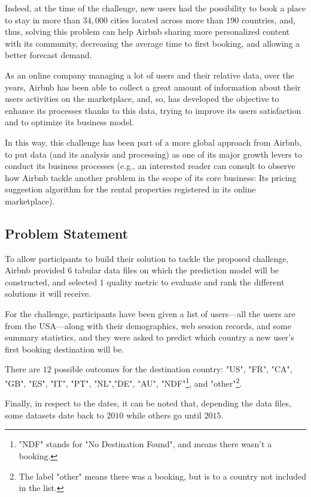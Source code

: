 \documentclass[twocolumn, switch]{article}
\begin{document}
Indeed, at the time of the challenge, new users had the possibility to book a place to stay in more than $34,000$ cities located across more than $190$ countries, and, thus, solving this problem can help Airbnb sharing more personalized content with its community, decreasing the average time to first booking, and allowing a better forecast demand.

As an online company managing a lot of users and their relative data, over the years, Airbnb has been able to collect a great amount of information about their users activities on the marketplace, and, so, has developed the objective to enhance its processes thanks to this data, trying to improve its users satisfaction and to optimize its business model.

In this way, this challenge has been part of a more global approach from Airbnb, to put data (and its analysis and processing) as one of its major growth levers to conduct its business processes (e.g., an interested reader can consult \cite{Hill_2015} to observe how Airbnb tackle another problem in the scope of its core business: Its pricing suggestion algorithm for the rental properties registered in its online marketplace).

\subsection{Problem Statement}

To allow participants to build their solution to tackle the proposed challenge, Airbnb provided $6$ tabular data files on which the prediction model will be constructed, and selected $1$ quality metric to evaluate and rank the different solutions it will receive.

For the challenge, participants have been given a list of users---all the users are from the USA---along with their demographics, web session records, and some summary statistics, and they were asked to predict which country a new user's first booking destination will be.

There are $12$ possible outcomes for the destination country: "US", "FR", "CA", "GB", "ES", "IT", "PT", "NL","DE", "AU", "NDF"\footnote{"NDF" stands for "No Destination Found", and means there wasn't a booking.}, and "other"\footnote{The label "other" means there was a booking, but is to a country not included in the list.}.

Finally, in respect to the dates, it can be noted that, depending the data files, some datasets date back to $2010$ while others go until $2015$.
\end{document}
